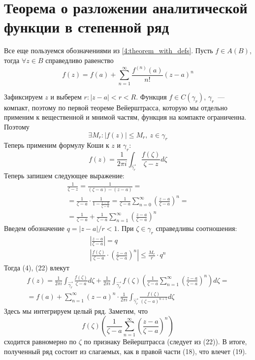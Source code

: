 \documentclass[main]{subfiles}
\begin{document}
\section{Теорема о разложении аналитической функции в степенной ряд}
\begin{theorem}
    Все еще пользуемся обозначениями из \ref{4:theorem_with_defs}.
    Пусть $f \in A(B)$, тогда $\forall z \in B$ справедливо равенство
    \[f(z) = f(a) + \sum_{n=1}^{\infty} \frac{f^{(n)}  (a)}{n!}(z-a)^n \tag{19}\]
\end{theorem}
\begin{longProof}
    Зафиксируем $z$ и выберем $r: |z - a| < r < R$.
    Функция $f \in C(\gamma_r)$, $\gamma_r$~--- компакт, поэтому по первой теореме Вейерштрасса, которую мы отдельно применим к вещественной и мнимой частям, функция на компакте ограниченна.
    Поэтому
    \[\exists M_r: |f(z)| \le  M_r,\ z \in \gamma_r \tag{20}\]
    Теперь применим формулу Коши к $z$ и $\gamma_r$:
    \[f(z) = \frac{1}{2 \pi i} \int_{\overrightarrow{\gamma_r}} \frac{f(\zeta)}{\zeta - z} d\zeta \tag{4}\]
    Теперь запишем следующее выражение:
    \begin{multline*}
        \frac{1}{\zeta - z} = \frac{1}{(\zeta - a) - (z - a)} = \\
        = \frac{1}{\zeta - a} \cdot \frac{1}{1 - \frac{z - a}{\zeta - a}} = \frac{1}{\zeta - a} \sum_{n = 0 }^{\infty} \left(\frac{z - a}{\zeta -a}\right)^n = \\
        = \frac{1}{\zeta - a} + \frac{1}{\zeta - a} \sum_{n = 1 }^{\infty} \left(\frac{z - a}{\zeta -a}\right)^n \tag{21}
    \end{multline*}
    Введем обозначение $q = |z - a|/r < 1$.
    При $\zeta \in \gamma_r$ справедливы соотношения:
    \begin{gather*}
        \left| \frac{z - a}{\zeta - a}\right| = q\\
        \left| \frac{f(\zeta)}{\zeta - a} \cdot \left( \frac{z - a}{\zeta - a} \right)^n \right| \le \frac{M_r}{r} \cdot q^n \tag{22}
    \end{gather*}
    Тогда (4), (22) влекут
    \begin{multline*}
        f(z) = \frac{1}{2 \pi i} \int_{\overrightarrow{\gamma_r}} \frac{f(\zeta)}{\zeta - a} d\zeta + \frac{1}{2 \pi i} \int_{\overrightarrow{\gamma_r}} f(\zeta) \left(\frac{1}{\zeta - a}  \sum_{n = 1 }^{\infty} \left(\frac{z - a}{\zeta -a}\right)^n\right)d\zeta = \\
        = f(a) + \sum_{n=1}^{\infty} (z-a)^n \cdot \frac{1}{2 \pi i} \int_{\overrightarrow{\gamma_r}} \frac{f(\zeta)}{(\zeta - a)^{n+1}} d\zeta
    \end{multline*}
    Здесь мы интегрируем целый ряд.
    Заметим, что
    \[f(\zeta) \left(\frac{1}{\zeta - a}  \sum_{n = 1 }^{\infty} \left(\frac{z - a}{\zeta -a}\right)^n\right)\]
    сходится равномерно по $\zeta$ по признаку Вейерштрасса (следует из (22)).
    В итоге, полученный ряд состоит из слагаемых, как в правой части (18), что влечет (19).
\end{longProof}
\end{document}
